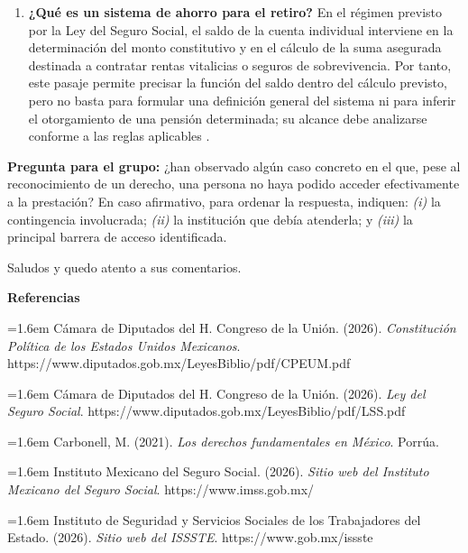 \documentclass[12pt,letterpaper,oneside]{article}
\begin{document}
\begin{forobox}[title={Intervención en el foro sobre seguridad social}]
\begin{enumerate}[leftmargin=1.6em,labelsep=0.6em,itemsep=0.5em,label=\textbf{\arabic*)}]
    \item \textbf{¿Qué es un sistema de ahorro para el retiro?} En el régimen previsto por la Ley del Seguro Social, el saldo de la cuenta individual interviene en la determinación del monto constitutivo y en el cálculo de la suma asegurada destinada a contratar rentas vitalicias o seguros de sobrevivencia. Por tanto, este pasaje permite precisar la función del saldo dentro del cálculo previsto, pero no basta para formular una definición general del sistema ni para inferir el otorgamiento de una pensión determinada; su alcance debe analizarse conforme a las reglas aplicables \citep{lss2026}.


\end{enumerate}
\medskip

\textbf{Pregunta para el grupo:} ¿han observado algún caso concreto en el que, pese al reconocimiento de un derecho, una persona no haya podido acceder efectivamente a la prestación? En caso afirmativo, para ordenar la respuesta, indiquen: \textit{(i)} la contingencia involucrada; \textit{(ii)} la institución que debía atenderla; y \textit{(iii)} la principal barrera de acceso identificada.\par
\medskip
Saludos y quedo atento a sus comentarios.
\medskip
\par\noindent\textbf{Referencias}\par
{\setlength{\parskip}{0.35em}%
\par\noindent\hangindent=1.6em Cámara de Diputados del H. Congreso de la Unión. (2026). \textit{Constitución Política de los Estados Unidos Mexicanos}. https://www.diputados.gob.mx/LeyesBiblio/pdf/CPEUM.pdf
\par\noindent\hangindent=1.6em Cámara de Diputados del H. Congreso de la Unión. (2026). \textit{Ley del Seguro Social}. https://www.diputados.gob.mx/LeyesBiblio/pdf/LSS.pdf
\par\noindent\hangindent=1.6em Carbonell, M. (2021). \textit{Los derechos fundamentales en México}. Porrúa.
\par\noindent\hangindent=1.6em Instituto Mexicano del Seguro Social. (2026). \textit{Sitio web del Instituto Mexicano del Seguro Social}. https://www.imss.gob.mx/
\par\noindent\hangindent=1.6em Instituto de Seguridad y Servicios Sociales de los Trabajadores del Estado. (2026). \textit{Sitio web del ISSSTE}. https://www.gob.mx/issste
\par}
\end{forobox}
\end{document}
